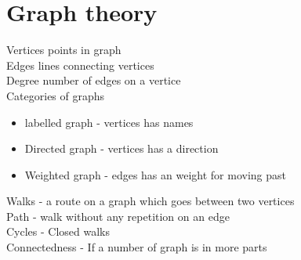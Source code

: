 \documentclass[12pt, a4paper]{article}
\begin{document}
			\section{Graph theory}
				Vertices points in graph\\
				Edges lines connecting vertices\\
				Degree number of edges on a vertice\\
				Categories of graphs
				\begin{itemize}
					\item labelled graph - vertices has names
					\item Directed graph - vertices has a direction
					\item Weighted graph - edges has an weight for moving past
				\end{itemize}
				Walks - a route on a graph which goes between two vertices\\
				Path - walk without any repetition on an edge\\
				Cycles - Closed walks\\
				Connectedness - If a number of graph is in more parts
\end{document}

